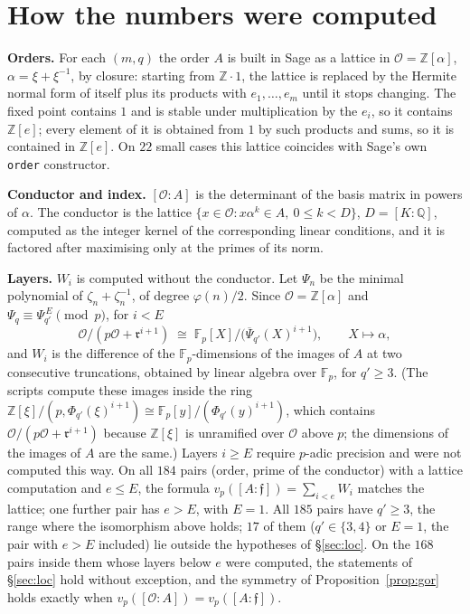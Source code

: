 \documentclass[11pt,a4paper]{article}
\theoremstyle{definition}
\newcommand{\ZZ}{\mathbb{Z}}
\newcommand{\QQ}{\mathbb{Q}}
\newcommand{\FF}{\mathbb{F}}
\newcommand{\cO}{\mathcal{O}}
\newcommand{\cf}{\mathfrak{f}}
\newcommand{\rad}{\mathfrak{r}}
\begin{document}
\section{How the numbers were computed}\label{sec:metodo}

\noindent\textbf{Orders.} For each $(m,q)$ the order $A$ is built in Sage as a lattice in $\cO=\ZZ[\alpha]$,
$\alpha=\xi+\xi^{-1}$, by closure: starting from $\ZZ\cdot1$, the lattice is replaced by the Hermite normal form of
itself plus its products with $e_1,\dots,e_m$ until it stops changing. The fixed point contains $1$ and is stable
under multiplication by the $e_i$, so it contains $\ZZ[e]$; every element of it is obtained from $1$ by such
products and sums, so it is contained in $\ZZ[e]$. On $22$ small cases this lattice coincides with Sage's own
\texttt{order} constructor.

\noindent\textbf{Conductor and index.} $[\cO:A]$ is the determinant of the basis matrix in powers of $\alpha$. The
conductor is the lattice $\{x\in\cO : x\alpha^k\in A,\ 0\le k<D\}$, $D=[K:\QQ]$, computed as the integer kernel of the
corresponding linear conditions, and it is factored after maximising only at the primes of its norm.

\noindent\textbf{Layers.} $W_i$ is computed without the conductor. Let $\Psi_n$ be the minimal polynomial of
$\zeta_n+\zeta_n^{-1}$, of degree $\varphi(n)/2$. Since $\cO=\ZZ[\alpha]$ and $\Psi_q\equiv\Psi_{q'}^{\,E}\pmod p$, for
$i<E$
\[
\cO/(p\cO+\rad^{i+1})\;\cong\;\FF_p[X]/\bigl(\overline\Psi_{q'}(X)^{i+1}\bigr),\qquad X\mapsto\alpha,
\]
and $W_i$ is the difference of the $\FF_p$-dimensions of the images of $A$ at two consecutive truncations, obtained
by linear algebra over $\FF_p$, for $q'\ge3$. (The scripts compute these images inside the ring
$\ZZ[\xi]/(p,\Phi_{q'}(\xi)^{i+1})\cong\FF_p[y]/(\Phi_{q'}(y)^{i+1})$, which contains $\cO/(p\cO+\rad^{i+1})$ because $\ZZ[\xi]$ is unramified over $\cO$ above $p$; the dimensions of
the images of $A$ are the same.) Layers $i\ge E$ require $p$-adic precision and were not computed this way. On all $184$ pairs (order,
prime of the conductor) with a lattice computation and $e\le E$, the formula $v_p([A:\cf])=\sum_{i<e}W_i$ matches
the lattice; one further pair has $e>E$, with $E=1$. All $185$ pairs have $q'\ge3$, the range where the
isomorphism above holds; $17$ of them ($q'\in\{3,4\}$ or $E=1$, the pair with $e>E$ included) lie outside the hypotheses of \S\ref{sec:loc}. On the
$168$ pairs inside them whose layers below $e$ were computed, the statements of \S\ref{sec:loc} hold without exception,
and the symmetry of Proposition~\ref{prop:gor} holds exactly when $v_p([\cO:A])=v_p([A:\cf])$.
\end{document}

